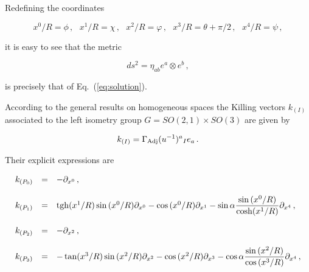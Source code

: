 \documentclass[12pt,a4paper]{article}
\begin{document}
Redefining the coordinates

\begin{equation}
x^{0}/R = \phi\, ,
\,\,\,\,
x^{1}/R = \chi\, ,
\,\,\,\,
x^{2}/R = \varphi\, ,
\,\,\,\,
x^{3}/R = \theta +\pi/2\, ,
\,\,\,\,
x^{4}/R=\psi\, ,
\end{equation}

\noindent
it is easy to see that the metric

\begin{equation}
ds^{2}= \eta_{ab}e^{a}\otimes e^{b}\, ,  
\end{equation}

\noindent
is precisely that of Eq.~(\ref{eq:solution}).

According to the general results on homogeneous spaces the Killing
vectors $k_{(I)}$ associated to the left isometry group
$G=SO(2,1)\times SO(3)$ are given by

\begin{equation}
k_{(I)}=\Gamma_{\rm Adj}(u^{-1})^{a}{}_{I} e_{a}\, .
\end{equation}

Their explicit expressions are 


\begin{equation}
  \begin{array}{rcl}
k_{(P_{0})} & = & 
-\partial_{x^{0}}\, ,\\
& & \\
k_{(P_{1})} & = & 
{\rm tgh}(x^{1}/R) \sin{(x^{0}/R)}\partial_{x^{0}}
-\cos{(x^{0}/R)}\partial_{x^{1}} 
-\sin{\alpha}{\displaystyle\frac{\sin{(x^{0}/R)}}{{\rm cosh}(x^{1}/R)}}
\partial_{x^{4}}\, ,\\
& & \\
k_{(P_{2})} & = & -\partial_{x^{2}}\, ,\\
& & \\
k_{(P_{3})} & = & 
-\tan(x^{3}/R) \sin{(x^{2}/R)}\partial_{x^{2}}
-\cos{(x^{2}/R)}\partial_{x^{3}} 
-\cos{\alpha}{\displaystyle\frac{\sin{(x^{2}/R)}}{\cos{(x^{3}/R)}}}
\partial_{x^{4}}\, ,\\
\end{array}
\end{equation}
\end{document}
